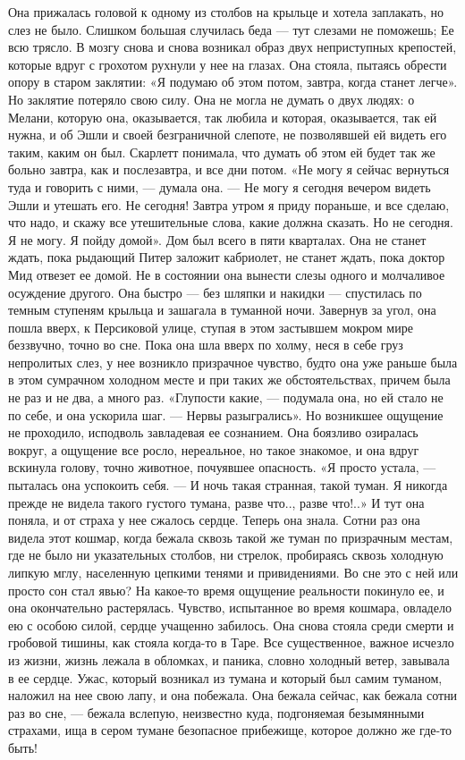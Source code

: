 Она прижалась головой к одному из столбов на крыльце и хотела заплакать, но слез не было. Слишком большая случилась беда — тут слезами не поможешь; Ее всю трясло. В мозгу снова и снова возникал образ двух неприступных крепостей, которые вдруг с грохотом рухнули у нее на глазах. Она стояла, пытаясь обрести опору в старом заклятии: «Я подумаю об этом потом, завтра, когда станет легче». Но заклятие потеряло свою силу. Она не могла не думать о двух людях: о Мелани, которую она, оказывается, так любила и которая, оказывается, так ей нужна, и об Эшли и своей безграничной слепоте, не позволявшей ей видеть его таким, каким он был. Скарлетт понимала, что думать об этом ей будет так же больно завтра, как и послезавтра, и все дни потом.
«Не могу я сейчас вернуться туда и говорить с ними, — думала она. — Не могу я сегодня вечером видеть Эшли и утешать его. Не сегодня! Завтра утром я приду пораньше, и все сделаю, что надо, и скажу все утешительные слова, какие должна сказать. Но не сегодня. Я не могу. Я пойду домой».
Дом был всего в пяти кварталах. Она не станет ждать, пока рыдающий Питер заложит кабриолет, не станет ждать, пока доктор Мид отвезет ее домой. Не в состоянии она вынести слезы одного и молчаливое осуждение другого. Она быстро — без шляпки и накидки — спустилась по темным ступеням крыльца и зашагала в туманной ночи. Завернув за угол, она пошла вверх, к Персиковой улице, ступая в этом застывшем мокром мире беззвучно, точно во сне.
Пока она шла вверх по холму, неся в себе груз непролитых слез, у нее возникло призрачное чувство, будто она уже раньше была в этом сумрачном холодном месте и при таких же обстоятельствах, причем была не раз и не два, а много раз. «Глупости какие, — подумала она, но ей стало не по себе, и она ускорила шаг. — Нервы разыгрались». Но возникшее ощущение не проходило, исподволь завладевая ее сознанием. Она боязливо озиралась вокруг, а ощущение все росло, нереальное, но такое знакомое, и она вдруг вскинула голову, точно животное, почуявшее опасность. «Я просто устала, — пыталась она успокоить себя. — И ночь такая странная, такой туман. Я никогда прежде не видела такого густого тумана, разве что.., разве что!..» И тут она поняла, и от страха у нее сжалось сердце. Теперь она знала. Сотни раз она видела этот кошмар, когда бежала сквозь такой же туман по призрачным местам, где не было ни указательных столбов, ни стрелок, пробираясь сквозь холодную липкую мглу, населенную цепкими тенями и привидениями. Во сне это с ней или просто сон стал явью?
На какое-то время ощущение реальности покинуло ее, и она окончательно растерялась. Чувство, испытанное во время кошмара, овладело ею с особою силой, сердце учащенно забилось. Она снова стояла среди смерти и гробовой тишины, как стояла когда-то в Таре. Все существенное, важное исчезло из жизни, жизнь лежала в обломках, и паника, словно холодный ветер, завывала в ее сердце. Ужас, который возникал из тумана и который был самим туманом, наложил на нее свою лапу, и она побежала. Она бежала сейчас, как бежала сотни раз во сне, — бежала вслепую, неизвестно куда, подгоняемая безымянными страхами, ища в сером тумане безопасное прибежище, которое должно же где-то быть!
